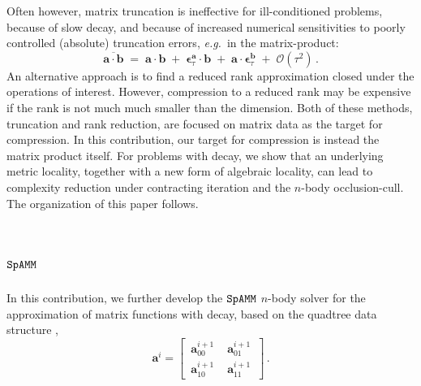 \documentclass[letterpaper,twocolumn,amsmath,amsfont,amssymb,english,aps,jcp,preprintnumbers,groupaddress,nofootinbib,tightenlines,floatfix]{revtex4}
\newcommand{\mat}[1]{\boldsymbol{#1}}
\theoremstyle{plain}
\theoremstyle{remark}
\theoremstyle{plain}
\begin{document}
Often however, matrix truncation is ineffective for ill-conditioned problems, 
because of slow decay, and because of increased numerical sensitivities to poorly 
controlled (absolute) truncation errors, {\em e.g.}~in the matrix-product:
\begin{equation} \label{sparseapprox}
\overline{ \mat{a} \cdot \mat{b} }\; = \; \mat{a}\cdot\mat{b} \; +\; \mat{\epsilon}^{\mat{a}}_\tau \cdot \mat{b} \;+\;
 \mat{a} \cdot \mat{\epsilon}^{\mat{b}}_\tau  \; + \;   {\mathcal O}(\tau^2) \, .
\end{equation}
An alternative approach is to find a reduced rank approximation closed under the operations of interest. 
However, compression to a reduced rank may be expensive if the rank is not much much smaller than the dimension.
Both of these methods, truncation and rank reduction, are focused on matrix data as the target for compression.
In this contribution, our target for compression is instead the matrix product itself.  For problems with
decay, we show that an underlying metric locality, together with a new form of algebraic locality, 
can lead to complexity reduction under contracting iteration and the $n$-body occlusion-cull. The organization of 
this paper follows.

\tableofcontents

\section{$\tt SpAMM$}

In this contribution, we further develop the $\tt SpAMM$ $n$-body solver for the
approximation of matrix functions with decay, based on the quadtree data structure 
\cite{Wise:1984:RMQ:1089389.1089398,springerlink:10.1007/3-540-51084-2_9,
      Samet:1990:DAS:77589,Wise1990,Wise:Ahnentafel,
      Lorton:2006:ABL:1166133.1166134,Samet:2006:DBDS,Adams:2006:SOS,bader13},
\begin{equation}
\mat{a}^i = \begin{bmatrix} \,  \mat{a}^{i+1}_{00} \, & \,  \mat{a}^{i+1}_{01} \,  
\\[0.2cm]  \, \mat{a}^{i+1}_{10} \,  & \,\mat{a}^{i+1}_{11} \, \end{bmatrix} \, .
\end{equation}
\end{document}
